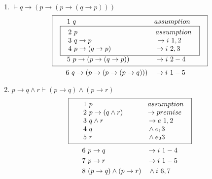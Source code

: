\documentclass[a4paper,10pt]{article}
\begin{document}
\begin{enumerate}
	\item[(3)]	%
		$\vdash q\to (p\to (p\to (q\to p)))$ \\
	\begin{align*}
		&\fbox{
			$\begin{array}{l}
			\quad 1\ q \ \quad\quad\quad\quad\quad\quad\quad\quad\quad\quad\quad assumption\\
	 			\fbox{
	 				$\begin{array}{l}
					2\ p \ \quad\quad\quad\quad\quad\quad\quad\quad\quad\quad\quad assumption\\
					3\ q\to p \ \quad\quad\quad\quad\quad\quad\quad\quad\quad \to i\ 1,2 \\
					4\ p\to (q\to p)  \ \quad\quad\quad\quad\quad\quad \to i\ 2,3 \\
		 			\end{array}$
				} \\
			\quad 5\ p\to (p\to (q\to p)) \ \ \quad\quad\quad \to i\ 2-4 \\
	 		\end{array}$
 		} \\
 		&\quad\quad 6\ q\to (p\to (p\to(p\to q))) \quad\to i\ 1-5 \\
	\end{align*}
	
	\newpage 	%
	
	\item[(4)]	%
		$p\to q\land r\vdash (p\to q)\land(p\to r)$ \\
	\begin{align*}
		&\fbox{
			$\begin{array}{l}
			\quad 1\ p \quad\quad\quad\quad\quad\quad\quad\quad assumption\\
			\quad 2\ p\to (q\land r) \ \quad\quad\quad \to premise \\
			\quad 3\ q\land r \ \quad\quad\quad\quad\quad\quad \to e\ 1,2 \\
			\quad 4\ q \quad\quad\quad\quad\quad\quad\quad\quad \land e_1 3 \\
			\quad 5\ r \quad\quad\quad\quad\quad\quad\quad\quad \land e_2 3 \\
	 		\end{array}$
 		} \\
 		&\quad\quad 6\ p\to q \quad\quad\quad\quad\quad\quad \to i\ 1-4 \\
 		&\quad\quad 7\ p\to r \quad\quad\quad\quad\quad\quad \to i\ 1-5 \\
 		&\quad\quad 8\ (p\to q)\land(p\to r)\quad \land i\ 6,7 \\
	\end{align*}
	

\end{enumerate}
\end{document}
